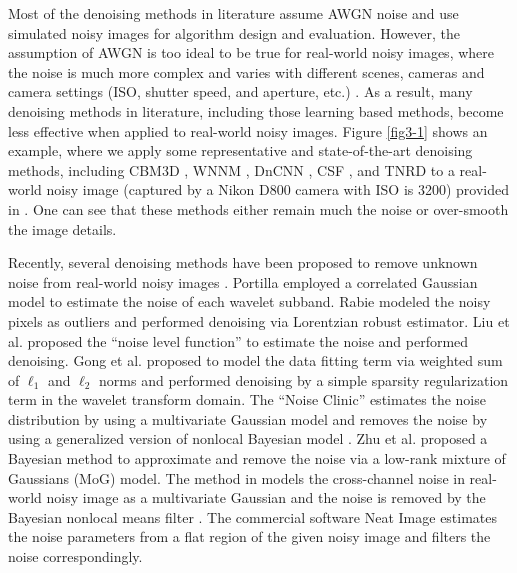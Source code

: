 Most of the denoising methods in literature \cite{bayesshrink,curvelet,ksvd,lssc,ncsr,bm3d,cbm3d,
zhou2012nonparametric,Tomasi1998,blsgsm,nlm,nlbayes,wnnm,pgpd,foe,epll,
mlp,xie2012image,dncnn,barbu2009training,csf,tnrd} assume AWGN noise and use simulated noisy images for algorithm design and evaluation. However, the assumption of AWGN is too ideal to be true for real-world noisy images, where the noise is much more complex and varies with different scenes, cameras and camera settings (ISO, shutter speed, and aperture, etc.) \cite{crosschannel2016,healey1994radiometric}. As a result, many denoising methods in literature, including those learning based methods, become less effective when applied to real-world noisy images. Figure \ref{fig3-1} shows an example, where we apply some representative and state-of-the-art denoising methods, including CBM3D \cite{cbm3d}, WNNM \cite{wnnm}, DnCNN \cite{dncnn}, CSF \cite{csf}, and TNRD \cite{tnrd} to a real-world noisy image (captured by a Nikon D800 camera with ISO is 3200) provided in \cite{crosschannel2016}. One can see that these methods either remain much the noise or over-smooth the image details.

Recently, several denoising methods have been proposed to remove unknown noise from real-world noisy images \cite{fullyblind,rabie2005robust,Liu2008,almapg,crosschannel2016,Zhu_2016_CVPR,noiseclinic,ncwebsite}. Portilla \cite{fullyblind} employed a correlated Gaussian model to estimate the noise of each wavelet subband. Rabie \cite{rabie2005robust} modeled the noisy pixels as outliers and performed denoising via Lorentzian robust estimator. Liu et al. \cite{Liu2008} proposed the ``noise level function'' to estimate the noise and performed denoising. Gong et al. \cite{almapg} proposed to model the data fitting term via weighted sum of $\ell_{1}$ and $\ell_{2}$ norms and performed denoising by a simple sparsity regularization term in the wavelet transform domain. The ``Noise Clinic'' \cite{noiseclinic,ncwebsite} estimates the noise distribution by using a multivariate Gaussian model and removes the noise by using a generalized version of nonlocal Bayesian model \cite{nlbayes}. Zhu et al. \cite{Zhu_2016_CVPR} proposed a Bayesian method to approximate and remove the noise via a low-rank mixture of Gaussians (MoG) model. The method in \cite{crosschannel2016} models the cross-channel noise in real-world noisy image as a multivariate Gaussian and the noise is removed by the Bayesian nonlocal means filter \cite{kervrann2007bayesian}. The commercial software Neat Image \cite{neatimage} estimates the noise parameters from a flat region of the given noisy image and filters the noise correspondingly. 

